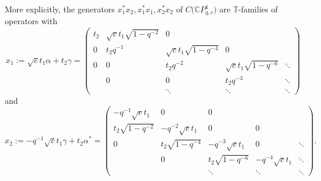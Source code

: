 \documentclass[11pt]{article}
\numberwithin{equation}{section}
\begin{document}
More explicitly, the generators $x_{1}^{\ast}x_{2},x_{1}^{\ast}x_{1},x_{2}^{\ast}x_{2}$ of $C\big( \mathbb{C}P_{q,c}^{1}\big) $ are
$\mathbb{T}$-families of operators with
\[
x_{1}:=\sqrt{c}t_{1}\alpha+t_{2}\gamma=\left(
\begin{matrix}
t_{2} & \sqrt{c}t_{1}\sqrt{1-q^{-2}} & 0 & & \\
0 & t_{2}q^{-1} & \sqrt{c}t_{1}\sqrt{1-q^{-4}} & 0 & \\
0 & 0 & t_{2}q^{-2} & \sqrt{c}t_{1}\sqrt{1-q^{-6}} & \ddots\\
& 0 & 0 & t_{2}q^{-3} & \ddots\\
& & \ddots & \ddots & \ddots
\end{matrix}
\right)
\]
and
\[
x_{2}:=-q^{-1}\sqrt{c}t_{1}\gamma+t_{2}\alpha^{\ast}=\left(
\begin{matrix}
-q^{-1}\sqrt{c}t_{1} & 0 & 0 & & \\
t_{2}\sqrt{1-q^{-2}} & -q^{-2}\sqrt{c}t_{1} & 0 & 0 & \\
0 & t_{2}\sqrt{1-q^{-4}} & -q^{-3}\sqrt{c}t_{1} & 0 & \ddots\\
& 0 & t_{2}\sqrt{1-q^{-6}} & -q^{-4}\sqrt{c}t_{1} & \ddots\\
& & \ddots & \ddots & \ddots
\end{matrix}
\right) .
\]
\end{document}
